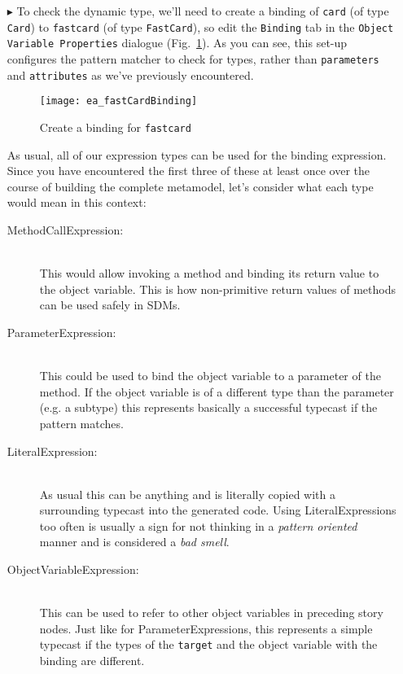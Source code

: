 \begin{itemize}
\vspace{0.5cm}
 
\item[$\blacktriangleright$] To check the dynamic type, we'll need to create a binding of \texttt{card} (of type \texttt{Card}) to \texttt{fastcard} (of
type \texttt{FastCard}), so edit the \texttt{Binding} tab in the \texttt{Object Variable Properties} dialogue (Fig.~\ref{fig:fastCardBinding}). As you can see,
this set-up configures the pattern matcher to check for types, rather than \texttt{parameters} and \texttt{attributes} as we've previously encountered.
  
\begin{figure}[htbp]
\begin{center}
  \texttt{[image: ea\_fastCardBinding]}
  \caption{Create a binding for \texttt{fastcard}}  
  \label{fig:fastCardBinding}
\end{center}
\end{figure}

 \clearpage

As usual, all of our expression types can be used for the binding expression. Since you have encountered the first three of these at least once over the course
of building the complete metamodel, let's consider what each type would mean in this context:
\begin{description}
  \item[MethodCallExpression:]~\\ This would allow invoking a method and binding
  its return value to the object variable.  This is how non-primitive return
  values of methods can be used safely in SDMs.
  
  \item[ParameterExpression:]~\\ This could be used to bind the object variable
  to a parameter of the method.  If the object variable is of a different type
  than the parameter (e.g. a subtype) this represents basically a successful
  typecast if the pattern matches.
  
  \item[LiteralExpression:]~\\ As usual this can be anything and is literally
  copied with a surrounding typecast into the generated code.  Using
  LiteralExpressions too often is usually a sign for not thinking in a
  \emph{pattern oriented} manner and is considered a \emph{bad smell}.

  
  \item[ObjectVariableExpression:]~\\ This can be used to refer to other object
  variables in preceding story nodes.  Just like for ParameterExpressions, this
  represents a simple typecast if the types of the \texttt{target} and the
  object variable with the binding are different.
\end{description}


\end{itemize}
